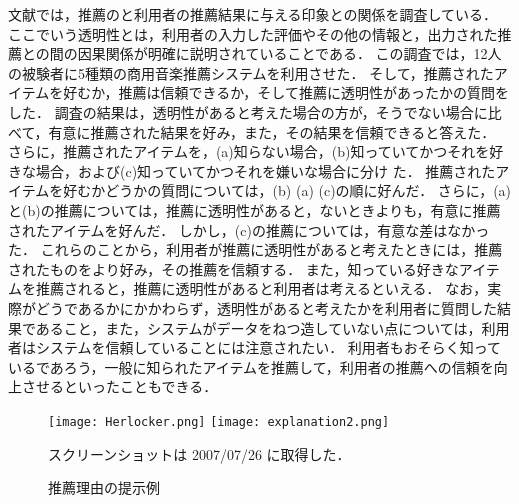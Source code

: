 文献\cite{sigchi:02:01}では，推薦のと利用者の推薦結果に与える印象との関係を調査している．
ここでいう透明性とは，利用者の入力した評価やその他の情報と，出力された推薦との間の因果関係が明確に説明されていることである．
この調査では，12人の被験者に5種類の商用音楽推薦システムを利用させた．
そして，推薦されたアイテムを好むか，推薦は信頼できるか，そして推薦に透明性があったかの質問をした．
調査の結果は，透明性があると考えた場合の方が，そうでない場合に比べて，有意に推薦された結果を好み，また，その結果を信頼できると答えた．
さらに，推薦されたアイテムを，(a)知らない場合，(b)知っていてかつそれを好きな場合，および(c)知っていてかつそれを嫌いな場合に分け
た．
推薦されたアイテムを好むかどうかの質問については，(b) (a) (c)の順に好んだ．
さらに，(a)と(b)の推薦については，推薦に透明性があると，ないときよりも，有意に推薦されたアイテムを好んだ．
しかし，(c)の推薦については，有意な差はなかった．
これらのことから，利用者が推薦に透明性があると考えたときには，推薦されたものをより好み，その推薦を信頼する．
また，知っている好きなアイテムを推薦されると，推薦に透明性があると利用者は考えるといえる．
なお，実際がどうであるかにかかわらず，透明性があると考えたかを利用者に質問した結果であること，また，システムがデータをねつ造していない点については，利用者はシステムを信頼していることには注意されたい．
利用者もおそらく知っているであろう，一般に知られたアイテムを推薦して，利用者の推薦への信頼を向上させるといったこともできる\cite{sigir:01:01}．

\begin{figure}
\centering
{}%
{\texttt{[image: Herlocker.png]}}%
\hspace{0.02\linewidth}%
%
{\texttt{[image: explanation2.png]}}\\
\caption{推薦理由の提示例}
\label{fig:explanation}
{\footnotesize スクリーンショットは 2007/07/26 に取得した．}
\end{figure}

